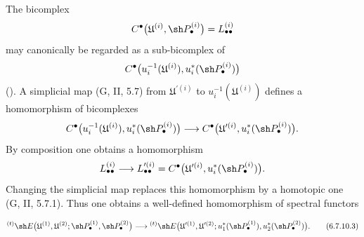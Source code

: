 \begin{env}[6.7.10]
The bicomplex
\[
  C^\bullet
  \bigl(
    \mathfrak U^{(i)},\sh P_\bullet^{(i)}
  \bigr)
  =
  L_{\bullet\bullet}^{(i)}
\]
may canonically be regarded as a sub-bicomplex of
\[
  C^\bullet
  \bigl(
    u_i^{-1}(\mathfrak U^{(i)}),
    u_i^*(\sh P_\bullet^{(i)})
  \bigr)
\]
().  A simplicial map
\textnormal{(G, II, 5.7)} from $\mathfrak U^{\prime(i)}$ to
$u_i^{-1}(\mathfrak U^{(i)})$ defines a homomorphism of
bicomplexes
\[
  C^\bullet
  \bigl(
    u_i^{-1}(\mathfrak U^{(i)}),
    u_i^*(\sh P_\bullet^{(i)})
  \bigr)
  \longrightarrow
  C^\bullet
  \bigl(
    \mathfrak U^{\prime(i)},
    u_i^*(\sh P_\bullet^{(i)})
  \bigr).
\]
By composition one obtains a homomorphism
\[
  L_{\bullet\bullet}^{(i)}
  \longrightarrow
  L_{\bullet\bullet}^{\prime(i)}
  =
  C^\bullet
  \bigl(
    \mathfrak U^{\prime(i)},
    u_i^*(\sh P_\bullet^{(i)})
  \bigr).
\]
Changing the simplicial map replaces this homomorphism by a
homotopic one \textnormal{(G, II, 5.7.1)}.  Thus one obtains a
well-defined homomorphism of spectral functors
\begin{env}[6.7.10.3]
\label{III.6.7.10.3}
\[
  {}^{(t)}\sh E
  \bigl(
    \mathfrak U^{(1)},\mathfrak U^{(2)};
    \sh P_\bullet^{(1)},\sh P_\bullet^{(2)}
  \bigr)
  \longrightarrow
  {}^{(t)}\sh E
  \bigl(
    \mathfrak U^{\prime(1)},\mathfrak U^{\prime(2)};
    u_1^*(\sh P_\bullet^{(1)}),
    u_2^*(\sh P_\bullet^{(2)})
  \bigr).
  \tag{6.7.10.3}\label{III.6.7.10.3.eq}
\]
\end{env}


\end{env}
